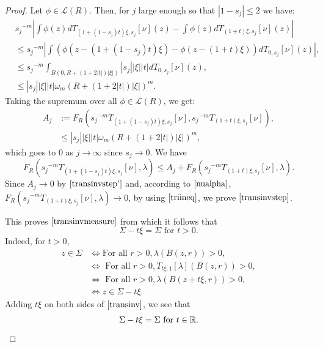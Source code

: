 \documentclass[11pt]{article}
\theoremstyle{definition}
\theoremstyle{remark}
\numberwithin{equation}{section}
\begin{document}
\begin{proof}
Let $\phi \in \mathcal{L}(R)$.
Then, for $j$ large enough so that $|1-s_j| \leq 2$ we have:
\begin{align*}
&{s_j}^{-m} \left| \int \phi(z) dT_{(1+(1-s_j) t)\xi, s_j}[\nu](z) - \int \phi(z) dT_{(1+t)\xi, s_j}[\nu](z) \right| \\& \leq 
{s_j}^{-m}  \left| \int \left( \phi(z-(1+(1-s_j) t)\xi)  - \phi(z-(1+t)\xi) \right) dT_{0, s_j}[\nu](z) \right|, \\
& \leq {s_j}^{-m} \int_{B(0, R+(1+2|t|)|\xi|)} |s_j||\xi| |t| dT_{0,s_j}[\nu](z) , \\
& \leq |s_j||\xi| |t|\omega_{m} (R+(1+2|t|)|\xi|)^{m}.
\end{align*}
Taking the supremum over all $\phi \in \mathcal{L}(R)$, we get: 
\begin{align}\label{transinvstep'}
A_{j} &:= F_{R}({s_j}^{-m} T_{(1+(1-s_j)t) \xi , s_j}[\nu], {s_j}^{-m} T_{(1+t) \xi , s_j}[\nu]), \nonumber \\ & \leq |s_j||\xi| |t|\omega_{m} (R+(1+2|t|)|\xi|)^{m},
\end{align}
which goes to $0$ as $j \to \infty$ since $s_{j} \to 0$.
We have 
\begin{equation}
\label{triineq} F_{R}({s_j}^{-m} T_{(1+(1-s_j)t) \xi , s_j}[\nu], \lambda) \leq A_{j} + F_{R}({s_j}^{-m} T_{(1+t) \xi , s_j}[\nu], \lambda).
\end{equation}
Since $A_j \to 0$ by $\eqref{transinvstep'}$ and, according to $\eqref{nualpha}$, $F_{R}({s_j}^{-m} T_{(1+t) \xi , s_j}[\nu], \lambda) \to 0$, by using $\eqref{triineq}$, we prove $\eqref{transinvstep}$.

This proves $\eqref{transinvmeasure}$ from which it follows that
\begin{equation} \label{transinv}
\Sigma - t \xi = \Sigma \mbox{ for } t>0.
\end{equation}
Indeed, for $t>0$,
\begin{align*}
z \in \Sigma & \iff \mbox{For all } r>0, \lambda(B(z,r))>0, \\
&\iff \mbox{ For all } r>0, T_{t\xi, 1} [\lambda](B(z,r)) >0, \\ & \iff \mbox{ For all } r>0, \lambda(B(z+t\xi, r))>0, \\ &\iff z \in \Sigma - t \xi .
\end{align*}
Adding $t\xi$ on both sides of $\ref{transinv}$, we see that
\begin{equation}\label{transinvfinal}
\Sigma - t \xi = \Sigma \mbox{ for } t \in \mathbb{R}.
\end{equation}



\end{proof}
\end{document}
